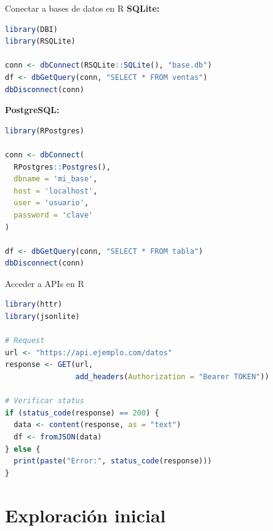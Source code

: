 \documentclass[aspectratio=169]{beamer}
\begin{document}
\begin{frame}[fragile]{Conectar a bases de datos en R}
\textbf{SQLite:}
\begin{lstlisting}[language=R]
library(DBI)
library(RSQLite)

conn <- dbConnect(RSQLite::SQLite(), "base.db")
df <- dbGetQuery(conn, "SELECT * FROM ventas")
dbDisconnect(conn)
\end{lstlisting}

\pause

\textbf{PostgreSQL:}
\begin{lstlisting}[language=R]
library(RPostgres)

conn <- dbConnect(
  RPostgres::Postgres(),
  dbname = 'mi_base',
  host = 'localhost',
  user = 'usuario',
  password = 'clave'
)

df <- dbGetQuery(conn, "SELECT * FROM tabla")
dbDisconnect(conn)
\end{lstlisting}
\end{frame}

\begin{frame}[fragile]{Acceder a APIs en R}
\begin{lstlisting}[language=R]
library(httr)
library(jsonlite)

# Request
url <- "https://api.ejemplo.com/datos"
response <- GET(url, 
                add_headers(Authorization = "Bearer TOKEN"))

# Verificar status
if (status_code(response) == 200) {
  data <- content(response, as = "text")
  df <- fromJSON(data)
} else {
  print(paste("Error:", status_code(response)))
}
\end{lstlisting}
\end{frame}

\section{Exploración inicial}
\end{document}
